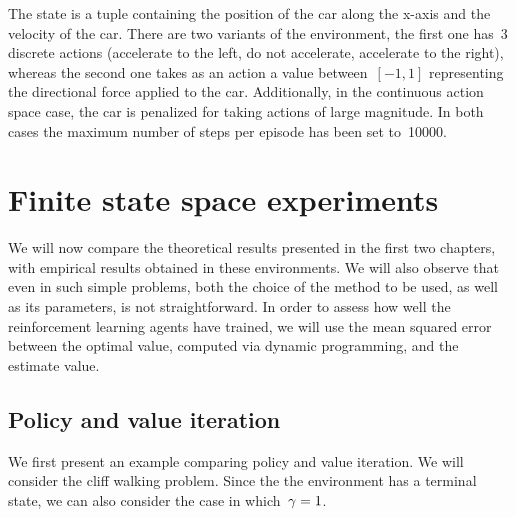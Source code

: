 The state is a tuple containing the position of the car along the x-axis and the velocity of the car. There are two variants of the environment, the first one has~3 discrete actions (accelerate to the left, do not accelerate, accelerate to the right), whereas the second one takes as an action a value between~${\left[-1,1\right]}$ representing the directional force applied to the car. Additionally, in the continuous action space case, the car is penalized for taking actions of large magnitude. In both cases the maximum number of steps per episode has been set to~10000.

\section{Finite state space experiments}
We will now compare the theoretical results presented in the first two chapters, with empirical results obtained in these environments. We will also observe that even in such simple problems, both the choice of the method to be used, as well as its parameters, is not straightforward. In order to assess how well the reinforcement learning agents have trained, we will use the mean squared error between the optimal value, computed via dynamic programming, and the estimate value.

\subsection{Policy and value iteration}
We first present an example comparing policy and value iteration. We will consider the cliff walking problem. Since the the environment has a terminal state, we can also consider the case in which~${\gamma=1}$.

